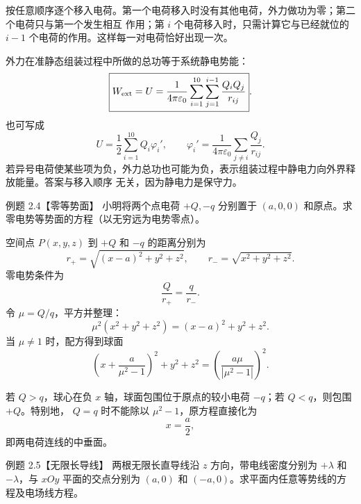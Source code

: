 \begin{xesolution}
按任意顺序逐个移入电荷。第一个电荷移入时没有其他电荷，外力做功为零；第二个电荷只与第一个发生相互
作用；第 $i$ 个电荷移入时，只需计算它与已经就位的 $i-1$ 个电荷的作用。这样每一对电荷恰好出现一次。

\chargeAssemblyFigure

外力在准静态组装过程中所做的总功等于系统静电势能：
\[
  \boxed{W_{\rm ext}=U
  =\frac{1}{4\pi\varepsilon_0}
  \sum_{i=1}^{10}\sum_{j=1}^{i-1}\frac{Q_iQ_j}{r_{ij}}}.
\]
也可写成
\[
  \boxed{U=\frac12\sum_{i=1}^{10}Q_i\varphi_i'},
  \qquad
  \varphi_i'=\frac{1}{4\pi\varepsilon_0}
  \sum_{j\ne i}\frac{Q_j}{r_{ij}}.
\]
若异号电荷使某些项为负，外力总功也可能为负，表示组装过程中静电力向外界释放能量。答案与移入顺序
无关，因为静电力是保守力。
\end{xesolution}

\begin{origexamplebox}{例题 2.4【零等势面】}
小明将两个点电荷 $+Q,-q$ 分别置于 $(a,0,0)$ 和原点。求零电势等势面的方程（以无穷远为电势零点）。
\end{origexamplebox}

\begin{xesolution}
空间点 $P(x,y,z)$ 到 $+Q$ 和 $-q$ 的距离分别为
\[
  r_+=\sqrt{(x-a)^2+y^2+z^2},
  \qquad r_-=\sqrt{x^2+y^2+z^2}.
\]
零电势条件为
\[
  \frac{Q}{r_+}=\frac{q}{r_-}.
\]
令 $\mu=Q/q$，平方并整理：
\[
  \mu^2(x^2+y^2+z^2)=(x-a)^2+y^2+z^2.
\]
当 $\mu\ne1$ 时，配方得到球面
\[
  \boxed{\left(x+\frac{a}{\mu^2-1}\right)^2+y^2+z^2
  =\left(\frac{a\mu}{|\mu^2-1|}\right)^2}.
\]

\apolloniusSphereFigure

若 $Q>q$，球心在负 $x$ 轴，球面包围位于原点的较小电荷 $-q$；若 $Q<q$，则包围 $+Q$。特别地，
$Q=q$ 时不能除以 $\mu^2-1$，原方程直接化为
\[
  \boxed{x=\frac a2},
\]
即两电荷连线的中垂面。
\end{xesolution}

\begin{origexamplebox}{例题 2.5【无限长导线】}
两根无限长直导线沿 $z$ 方向，带电线密度分别为 $+\lambda$ 和 $-\lambda$，与 $xOy$ 平面的交点分别为
$(a,0)$ 和 $(-a,0)$。求平面内任意等势线的方程及电场线方程。
\end{origexamplebox}

